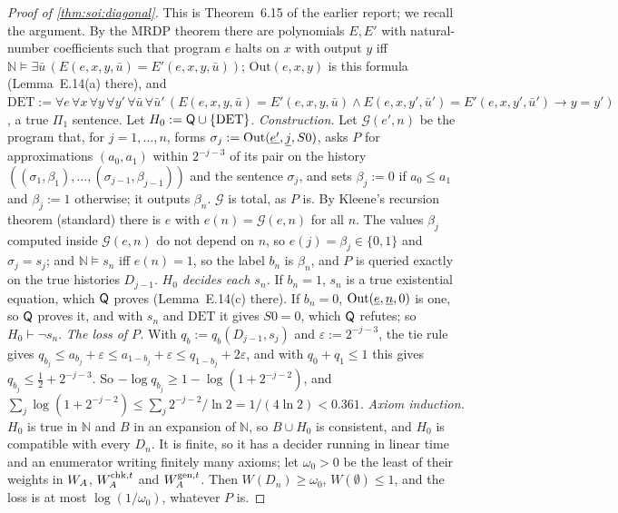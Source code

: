 \begin{proof}[Proof of \cref{thm:soi:diagonal}]
This is Theorem~6.15 of the earlier report; we recall the argument. By the MRDP theorem \citep{matiyasevich1970enumerable,davis1973hilbert} there are polynomials $E,E'$ with natural-number coefficients such that program $e$ halts on $x$ with output $y$ iff $\mathbb N\models\exists\bar u\,(E(e,x,y,\bar u)=E'(e,x,y,\bar u))$; $\mathrm{Out}(e,x,y)$ is this formula (Lemma~E.14(a) there), and $\mathrm{DET}:=\forall e\,\forall x\,\forall y\,\forall y'\,\forall\bar u\,\forall\bar u'\,(E(e,x,y,\bar u)=E'(e,x,y,\bar u)\wedge E(e,x,y',\bar u')=E'(e,x,y',\bar u')\to y=y')$, a true $\Pi_1$ sentence. Let $H_0:=\mathsf{Q}\cup\{\mathrm{DET}\}$.
\emph{Construction.} Let $\mathcal G(e',n)$ be the program that, for $j=1,\dots,n$, forms $\sigma_j:=\mathrm{Out}(\underline{e'},\underline{j},S0)$, asks $P$ for approximations $(a_0,a_1)$ within $2^{-j-3}$ of its pair on the history $((\sigma_1,\beta_1),\dots,(\sigma_{j-1},\beta_{j-1}))$ and the sentence $\sigma_j$, and sets $\beta_j:=0$ if $a_0\le a_1$ and $\beta_j:=1$ otherwise; it outputs $\beta_n$. $\mathcal G$ is total, as $P$ is. By Kleene's recursion theorem (standard) there is $e$ with $e(n)=\mathcal G(e,n)$ for all $n$. The values $\beta_j$ computed inside $\mathcal G(e,n)$ do not depend on $n$, so $e(j)=\beta_j\in\{0,1\}$ and $\sigma_j=s_j$; and $\mathbb N\models s_n$ iff $e(n)=1$, so the label $b_n$ is $\beta_n$, and $P$ is queried exactly on the true histories $D_{j-1}$.
\emph{$H_0$ decides each $s_n$.} If $b_n=1$, $s_n$ is a true existential equation, which $\mathsf{Q}$ proves (Lemma~E.14(c) there). If $b_n=0$, $\mathrm{Out}(\underline{e},\underline{n},0)$ is one, so $\mathsf{Q}$ proves it, and with $s_n$ and $\mathrm{DET}$ it gives $S0=0$, which $\mathsf{Q}$ refutes; so $H_0\vdash\neg s_n$.
\emph{The loss of $P$.} With $q_b:=q_b(D_{j-1},s_j)$ and $\varepsilon:=2^{-j-3}$, the tie rule gives $q_{b_j}\le a_{b_j}+\varepsilon\le a_{1-b_j}+\varepsilon\le q_{1-b_j}+2\varepsilon$, and with $q_0+q_1\le1$ this gives $q_{b_j}\le\frac12+2^{-j-3}$. So $-\log q_{b_j}\ge1-\log(1+2^{-j-2})$, and $\sum_j\log(1+2^{-j-2})\le\sum_j2^{-j-2}/\ln2=1/(4\ln2)<0.361$.
\emph{Axiom induction.} $H_0$ is true in $\mathbb N$ and $B$ in an expansion of $\mathbb N$, so $B\cup H_0$ is consistent, and $H_0$ is compatible with every $D_n$. It is finite, so it has a decider running in linear time and an enumerator writing finitely many axioms; let $\omega_0>0$ be the least of their weights in $W_{A}$, $W_{A}^{\mathrm{chk},t}$ and $W_{A}^{\mathrm{gen},t}$. Then $W(D_n)\ge\omega_0$, $W(\emptyset)\le1$, and the loss is at most $\log(1/\omega_0)$, whatever $P$ is.

\end{proof}
